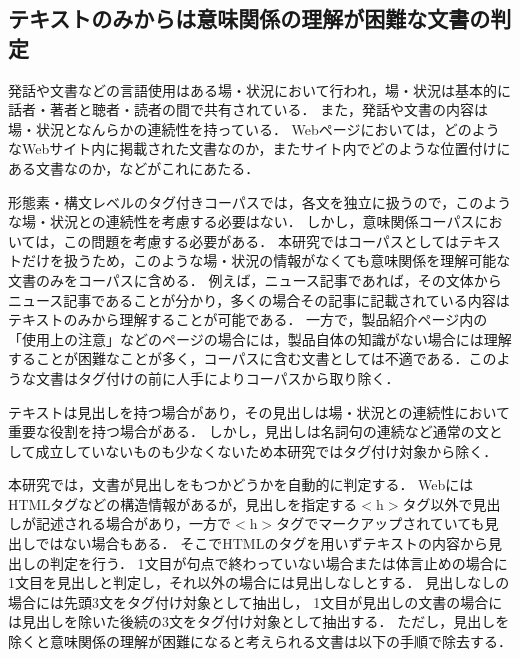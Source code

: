 \documentclass[japanese]{jnlp_1.4}
\begin{document}
\subsection{テキストのみからは意味関係の理解が困難な文書の判定}
\label{意味・談話関係の理解が困難な文書の判定}

発話や文書などの言語使用はある場・状況において行われ，場・状況は基本的に話者・著者と聴者・読者の間で共有されている．
また，発話や文書の内容は場・状況となんらかの連続性を持っている．
Webページにおいては，どのようなWebサイト内に掲載された文書なのか，またサイト内でどのような位置付けにある文書なのか，などがこれにあたる．

形態素・構文レベルのタグ付きコーパスでは，各文を独立に扱うので，このような場・状況との連続性を考慮する必要はない．
しかし，意味関係コーパスにおいては，この問題を考慮する必要がある．
本研究ではコーパスとしてはテキストだけを扱うため，このような場・状況の情報がなくても意味関係を理解可能な文書のみをコーパスに含める．
例えば，ニュース記事であれば，その文体からニュース記事であることが分かり，多くの場合その記事に記載されている内容はテキストのみから理解することが可能である．
一方で，製品紹介ページ内の「使用上の注意」などのページの場合には，製品自体の知識がない場合には理解することが困難なことが多く，コーパスに含む文書としては不適である．このような文書はタグ付けの前に人手によりコーパスから取り除く．

テキストは見出しを持つ場合があり，その見出しは場・状況との連続性において重要な役割を持つ場合がある．
しかし，見出しは名詞句の連続など通常の文として成立していないものも少なくないため本研究ではタグ付け対象から除く．


本研究では，文書が見出しをもつかどうかを自動的に判定する．
WebにはHTMLタグなどの構造情報があるが，見出しを指定する$<$h$>$タグ以外で見出しが記述される場合があり，一方で$<$h$>$タグでマークアップされていても見出しではない場合もある．
そこでHTMLのタグを用いずテキストの内容から見出しの判定を行う．
1文目が句点で終わっていない場合または体言止めの場合に1文目を見出しと判定し，それ以外の場合には見出しなしとする．
見出しなしの場合には先頭3文をタグ付け対象として抽出し， 1文目が見出しの文書の場合には見出しを除いた後続の3文をタグ付け対象として抽出する．
ただし，見出しを除くと意味関係の理解が困難になると考えられる文書は以下の手順で除去する．
\end{document}
